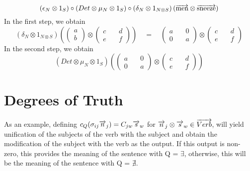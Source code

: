 \[
(\epsilon_N \otimes 1_S) \circ (Det \otimes  \mu_N \otimes 1_S) \circ (\delta_N \otimes 1_{N \otimes S})\left(\overrightarrow{\text{men}} \otimes \overrightarrow{\text{sneeze}}\right)
\]
In the first step, we obtain
\[
(\delta_N \otimes 1_{N \otimes S})\left( \left ( \begin{array}{c} a\\b\end{array}\right) \otimes  \left (\begin{array}{cc} c \quad & d\\ e \quad &f \end{array}\right)\right) \quad = \quad \left(\begin{array}{cc} a \quad & 0\\ 0 \quad & a\end{array}\right) \otimes  \left (\begin{array}{cc} c \quad & d\\ e \quad &f \end{array}\right)
\]
In the second step, we obtain
\[
(Det \otimes  \mu_N \otimes 1_S) \left(\left(\begin{array}{cc} a \quad & 0\\ 0 \quad & a\end{array}\right) \otimes  \left (\begin{array}{cc} c \quad & d\\ e \quad &f \end{array}\right) \right)
\]

\section{Degrees of Truth}

As an example, defining  $c_Q(\sigma_{ij} \overrightarrow{n}_j) =  C_{jw}\overrightarrow{s}_w$ for $\overrightarrow{n}_j \otimes \overrightarrow{s}_w \in \overrightarrow{Verb}$, will yield unification of  the subjects of the verb with the subject and obtain the modification of the subject with the verb as the output. If this output is non-zero, this provides the meaning of the sentence with Q = $\exists$, otherwise, this will be the meaning of the sentence  with Q = $\nexists$. 

